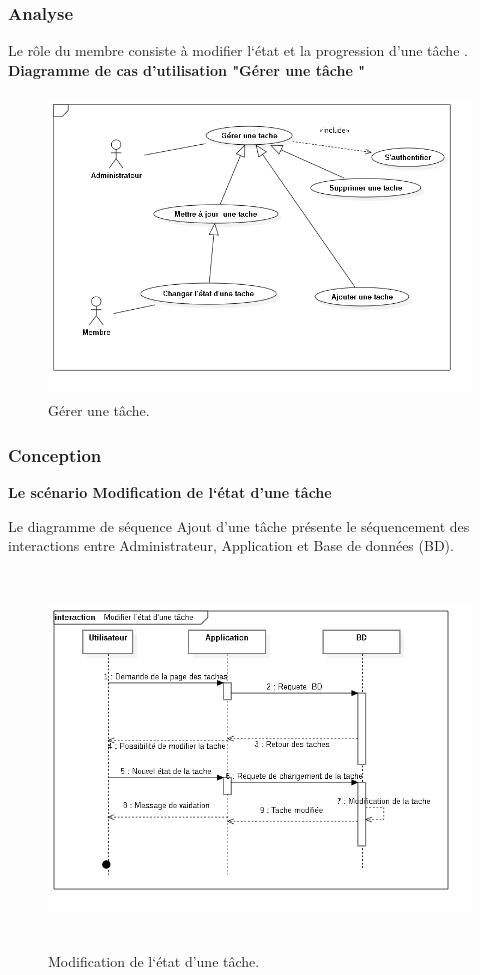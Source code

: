 \subsubsection{Analyse}

Le r\^{o}le  du membre consiste à modifier  l`\'{e}tat et la progression d'une t\^{a}che .
 \textbf{ Diagramme de cas d'utilisation "G\'{e}rer une t\^{a}che "}
    \begin{figure}[H]
    \center
    \includegraphics[width=13cm,height=8cm]{./figures/ucT.png}
    \caption{G\'{e}rer une  t\^{a}che.}

    \end{figure}

\subsubsection{Conception}
\textbf{ Le sc\'{e}nario \guillemotleft{} Modification de l`\'{e}tat d'une t\^{a}che\guillemotright{}}

Le diagramme de s\'{e}quence \guillemotleft{} Ajout d'une t\^{a}che \guillemotright{} pr\'{e}sente le s\'{e}quencement
des interactions entre Administrateur, Application et Base de donn\'{e}es (BD).


\begin{figure}[H]
\center
\includegraphics[width=14cm,height=10cm]{./figures/seq/D.png}
\caption{ Modification de l`\'{e}tat d'une t\^{a}che.}
\end{figure}

